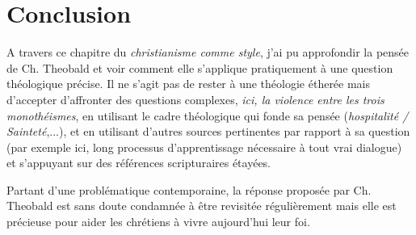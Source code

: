 \begin{comment}
    Paul Ricoeur est un philosophe français qui a travaillé sur la notion de pré-éthique. Selon lui, la pré-éthique est une étape préalable à l’éthique qui permet de comprendre les conditions de possibilité de l’éthique. Elle se situe entre la métaphysique et l’éthique et vise à déterminer les conditions d’existence de l’éthique. La pré-éthique est donc une réflexion sur les fondements de l’éthique et sur les conditions qui permettent à l’éthique d’exister. Elle est également une réflexion sur les limites de l’éthique et sur les questions que l’éthique ne peut pas résoudre1.
    À notre avis, cette
altérité doit paradoxalement être étendue jusqu’au soi ; nous sommes obligé d’étendre le
terme « autrui » jusqu’à « moi », dans une sorte d’altérité réflexive, différente de celle,
pré-éthique, défendue par P. Ricoeur.
\end{comment}


 



  

\section{Conclusion}
A travers ce chapitre du \textit{christianisme comme style}, j'ai pu approfondir la pensée de Ch. Theobald et voir comment elle s'applique pratiquement à une question théologique précise. Il ne s'agit pas de rester à une théologie étherée mais d'accepter d'affronter des questions complexes, \textit{ici, la violence entre les trois monothéismes}, en utilisant le cadre théologique qui fonde sa pensée (\textit{hospitalité / Sainteté},...), et en utilisant d'autres sources pertinentes par rapport à sa question (par exemple ici, long processus d'apprentissage nécessaire à tout vrai dialogue) et s'appuyant sur des références scripturaires étayées. 

Partant d'une problématique contemporaine, la réponse proposée par Ch. Theobald est sans doute condamnée à être revisitée régulièrement mais elle est précieuse pour aider les chrétiens à vivre aujourd'hui  leur foi.




 




